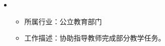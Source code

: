   \begin{itemize}[leftmargin=*]
    \item
      {\small
      \begin{itemize}
        \item 所属行业：公立教育部门
        \item 工作描述：协助指导教师完成部分教学任务。
      \end{itemize}
      }
  \end{itemize}
